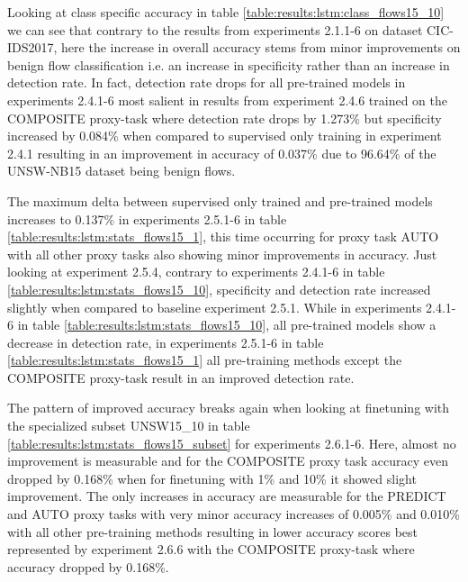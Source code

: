 Looking at class specific accuracy in table \ref{table:results:lstm:class_flows15_10} we can see that contrary to the results from experiments 2.1.1-6 on dataset CIC-IDS2017, here the increase in overall accuracy stems from minor improvements on benign flow classification i.e. an increase in specificity rather than an increase in detection rate. In fact, detection rate drops for all pre-trained models in experiments 2.4.1-6 most salient in results from experiment 2.4.6 trained on the COMPOSITE proxy-task where detection rate drops by 1.273\% but specificity increased by 0.084\% when compared to supervised only training in experiment 2.4.1 resulting in an improvement in accuracy of 0.037\% due to 96.64\% of the UNSW-NB15 dataset being benign flows. \par



The maximum delta between supervised only trained and pre-trained models increases to 0.137\% in experiments 2.5.1-6 in table \ref{table:results:lstm:stats_flows15_1}, this time occurring for proxy task AUTO with all other proxy tasks also showing minor improvements in accuracy. Just looking at experiment 2.5.4, contrary to experiments 2.4.1-6 in table  \ref{table:results:lstm:stats_flows15_10}, specificity and detection rate increased slightly when compared to baseline experiment 2.5.1. While in experiments 2.4.1-6 in table \ref{table:results:lstm:stats_flows15_10}, all pre-trained models show a decrease in detection rate, in experiments 2.5.1-6 in table  \ref{table:results:lstm:stats_flows15_1} all pre-training methods except the COMPOSITE proxy-task result in an improved detection rate. \par



The pattern of improved accuracy breaks again when looking at finetuning with the specialized subset UNSW15\_10 in table \ref{table:results:lstm:stats_flows15_subset} for experiments 2.6.1-6. Here, almost no improvement is measurable and for the COMPOSITE proxy task accuracy even dropped by 0.168\% when for finetuning with 1\% and 10\% it showed slight improvement. The only increases in accuracy are measurable for the PREDICT and AUTO proxy tasks with very minor accuracy increases of 0.005\% and 0.010\% with all other pre-training methods resulting in lower accuracy scores best represented by experiment 2.6.6 with the COMPOSITE proxy-task where accuracy dropped by 0.168\%. \par


